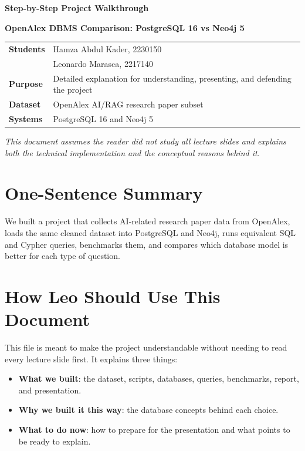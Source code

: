 \documentclass[11pt]{article}
\begin{document}
\begin{titlepage}
    \centering
    \vspace*{1.4cm}
    {\LARGE \textbf{Step-by-Step Project Walkthrough}\par}
    \vspace{0.4cm}
    {\large \textbf{OpenAlex DBMS Comparison: PostgreSQL 16 vs Neo4j 5}\par}
    \vspace{1cm}
    \begin{tabular}{ll}
        \textbf{Students} & Hamza Abdul Kader, 2230150\\
                          & Leonardo Marasca, 2217140\\
        \textbf{Purpose} & Detailed explanation for understanding, presenting, and defending the project\\
        \textbf{Dataset} & OpenAlex AI/RAG research paper subset\\
        \textbf{Systems} & PostgreSQL 16 and Neo4j 5\\
    \end{tabular}
    \vfill
    \textit{This document assumes the reader did not study all lecture slides and explains both the technical implementation and the conceptual reasons behind it.}
\end{titlepage}

\tableofcontents
\newpage

\section{One-Sentence Summary}

We built a project that collects AI-related research paper data from OpenAlex, loads the same cleaned dataset into PostgreSQL and Neo4j, runs equivalent SQL and Cypher queries, benchmarks them, and compares which database model is better for each type of question.

\section{How Leo Should Use This Document}

This file is meant to make the project understandable without needing to read every lecture slide first.
It explains three things:

\begin{itemize}
    \item \textbf{What we built}: the dataset, scripts, databases, queries, benchmarks, report, and presentation.
    \item \textbf{Why we built it this way}: the database concepts behind each choice.
    \item \textbf{What to do now}: how to prepare for the presentation and what points to be ready to explain.
\end{itemize}
\end{document}
